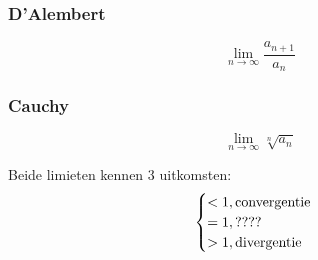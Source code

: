 \subsubsection{D'Alembert}
$$\lim\limits_{n\to\infty} \frac{a_{n + 1}}{a_n}$$
\subsubsection{Cauchy}
$$\lim\limits_{n\to\infty} \sqrt[n]{a_n}$$

Beide limieten kennen 3 uitkomsten:
$$
    \begin{cases}
        < 1, \hbox{convergentie} \\
        = 1, ???? \\
        > 1, \hbox{divergentie}
    \end{cases}
$$

